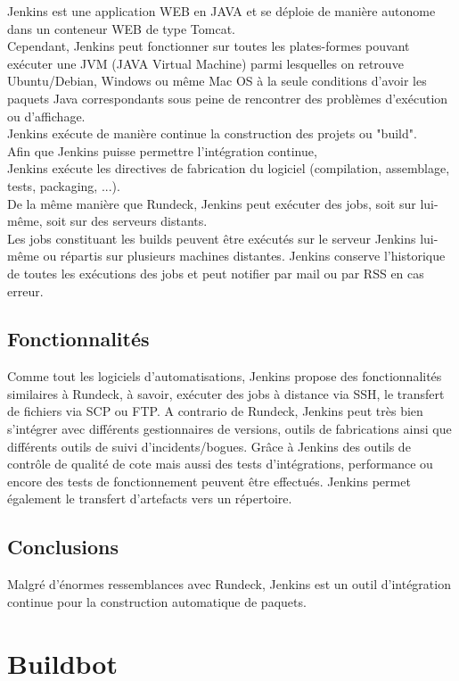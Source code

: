 \documentclass[12pt]{article}
\begin{document}
Jenkins est une application WEB en JAVA et se déploie de manière autonome dans un conteneur WEB de type Tomcat.
\\
Cependant, Jenkins peut fonctionner sur toutes les plates-formes pouvant exécuter une JVM (JAVA Virtual Machine) parmi lesquelles on retrouve Ubuntu/Debian, Windows ou même Mac OS à la seule conditions d'avoir les paquets Java correspondants sous peine de rencontrer des problèmes d'exécution ou d'affichage.
\\
Jenkins exécute de manière continue la construction des projets ou "build".
\\ 
Afin que Jenkins puisse permettre l'intégration continue, 
\\
Jenkins exécute les directives de fabrication du logiciel (compilation, assemblage, tests, packaging, ...).
\\
De la même manière que Rundeck, Jenkins peut exécuter des jobs, soit sur lui-même, soit sur des serveurs distants.
\\
Les jobs constituant les builds peuvent être exécutés sur le serveur Jenkins lui-même ou répartis sur plusieurs machines distantes. Jenkins conserve l'historique de toutes les exécutions des jobs et peut notifier par mail ou par RSS en cas erreur.

\subsection{Fonctionnalités}
Comme tout les logiciels d'automatisations, Jenkins propose des fonctionnalités similaires à Rundeck, à savoir, exécuter des jobs à distance via SSH,  le transfert de fichiers via SCP ou FTP. A contrario de Rundeck, Jenkins peut très bien s'intégrer avec différents gestionnaires de versions, outils de fabrications ainsi que différents outils de suivi d'incidents/bogues. Grâce à Jenkins des outils de contrôle de qualité de cote mais aussi des tests d'intégrations, performance ou encore des tests de fonctionnement peuvent être effectués. Jenkins permet également le transfert d'artefacts vers un répertoire.

\subsection{Conclusions}
Malgré d'énormes ressemblances avec Rundeck, Jenkins est un outil d'intégration continue pour la construction automatique de paquets.

\section{Buildbot}
\end{document}
